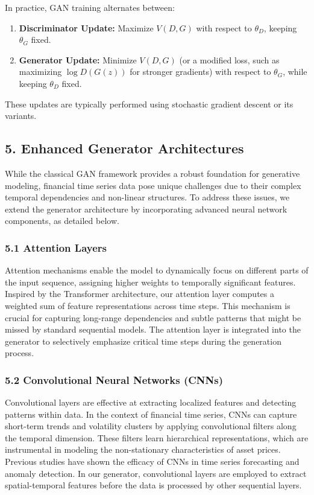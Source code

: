 \documentclass{article}
\begin{document}
In practice, GAN training alternates between:
\begin{enumerate}
    \item \textbf{Discriminator Update:} Maximize $V(D, G)$ with respect to $\theta_D$, keeping $\theta_G$ fixed.
    \item \textbf{Generator Update:} Minimize $V(D, G)$ (or a modified loss, such as maximizing $\log D(G(z))$ for stronger gradients) with respect to $\theta_G$, while keeping $\theta_D$ fixed.
\end{enumerate}
These updates are typically performed using stochastic gradient descent or its variants.

\subsection*{5. Enhanced Generator Architectures}

While the classical GAN framework provides a robust foundation for generative modeling, financial time series data pose unique challenges due to their complex temporal dependencies and non-linear structures. To address these issues, we extend the generator architecture by incorporating advanced neural network components, as detailed below.

\subsubsection*{5.1 Attention Layers}

Attention mechanisms enable the model to dynamically focus on different parts of the input sequence, assigning higher weights to temporally significant features. Inspired by the Transformer architecture, our attention layer computes a weighted sum of feature representations across time steps. This mechanism is crucial for capturing long-range dependencies and subtle patterns that might be missed by standard sequential models. The attention layer is integrated into the generator to selectively emphasize critical time steps during the generation process.

\subsubsection*{5.2 Convolutional Neural Networks (CNNs)}

Convolutional layers are effective at extracting localized features and detecting patterns within data. In the context of financial time series, CNNs can capture short-term trends and volatility clusters by applying convolutional filters along the temporal dimension. These filters learn hierarchical representations, which are instrumental in modeling the non-stationary characteristics of asset prices. Previous studies have shown the efficacy of CNNs in time series forecasting and anomaly detection. In our generator, convolutional layers are employed to extract spatial-temporal features before the data is processed by other sequential layers.
\end{document}
